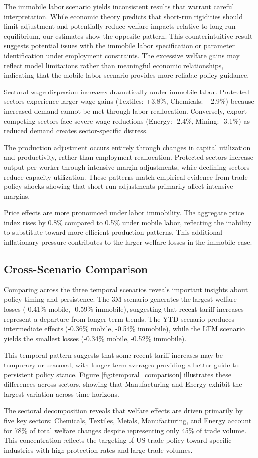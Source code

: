 The immobile labor scenario yields inconsistent results that warrant careful interpretation. While economic theory predicts that short-run rigidities should limit adjustment and potentially reduce welfare impacts relative to long-run equilibrium, our estimates show the opposite pattern. This counterintuitive result suggests potential issues with the immobile labor specification or parameter identification under employment constraints. The excessive welfare gains may reflect model limitations rather than meaningful economic relationships, indicating that the mobile labor scenario provides more reliable policy guidance.

Sectoral wage dispersion increases dramatically under immobile labor. Protected sectors experience larger wage gains (Textiles: +3.8\%, Chemicals: +2.9\%) because increased demand cannot be met through labor reallocation. Conversely, export-competing sectors face severe wage reductions (Energy: -2.4\%, Mining: -3.1\%) as reduced demand creates sector-specific distress.

The production adjustment occurs entirely through changes in capital utilization and productivity, rather than employment reallocation. Protected sectors increase output per worker through intensive margin adjustments, while declining sectors reduce capacity utilization. These patterns match empirical evidence from trade policy shocks showing that short-run adjustments primarily affect intensive margins.

Price effects are more pronounced under labor immobility. The aggregate price index rises by 0.8\% compared to 0.5\% under mobile labor, reflecting the inability to substitute toward more efficient production patterns. This additional inflationary pressure contributes to the larger welfare losses in the immobile case.

\subsection{Cross-Scenario Comparison}

Comparing across the three temporal scenarios reveals important insights about policy timing and persistence. The 3M scenario generates the largest welfare losses (-0.41\% mobile, -0.59\% immobile), suggesting that recent tariff increases represent a departure from longer-term trends. The YTD scenario produces intermediate effects (-0.36\% mobile, -0.54\% immobile), while the LTM scenario yields the smallest losses (-0.34\% mobile, -0.52\% immobile).

This temporal pattern suggests that some recent tariff increases may be temporary or seasonal, with longer-term averages providing a better guide to persistent policy stance. Figure \ref{fig:temporal_comparison} illustrates these differences across sectors, showing that Manufacturing and Energy exhibit the largest variation across time horizons.

The sectoral decomposition reveals that welfare effects are driven primarily by five key sectors: Chemicals, Textiles, Metals, Manufacturing, and Energy account for 78\% of total welfare changes despite representing only 45\% of trade volume. This concentration reflects the targeting of US trade policy toward specific industries with high protection rates and large trade volumes.
